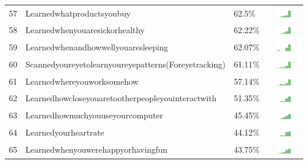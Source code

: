 \documentclass[a4paper,12pt]{article}
\begin{document}
\begin{longtable}{| p{0.5cm} | p{7cm} | p{1cm} | c |}
57 & Learnedwhatproductsyoubuy & 62.5\% & \includegraphics[width = 2cm, height = 0.5cm]{learnedwhatproductsyoubuyWORKCONTACTS} \\  
58 & Learnedwhenyouaresickorhealthy & 62.22\% & \includegraphics[width = 2cm, height = 0.5cm]{learnedwhenyouaresickorhealthyWORKCONTACTS} \\  
59 & Learnedwhenandhowwellyouaresleeping & 62.07\% & \includegraphics[width = 2cm, height = 0.5cm]{learnedwhenandhowwellyouaresleepingWORKCONTACTS} \\  
60 & Scannedyoureyetolearnyoureyepatterns(Foreyetracking) & 61.11\% & \includegraphics[width = 2cm, height = 0.5cm]{scannedyoureyetolearnyoureyepatterns(foreyetracking)WORKCONTACTS} \\  
61 & Learnedwhereyouworksomehow & 57.14\% & \includegraphics[width = 2cm, height = 0.5cm]{learnedwhereyouworksomehowWORKCONTACTS} \\  
62 & Learnedhowcloseyouaretootherpeopleyouinteractwith & 51.35\% & \includegraphics[width = 2cm, height = 0.5cm]{learnedhowcloseyouaretootherpeopleyouinteractwithWORKCONTACTS} \\  
63 & Learnedhowmuchyouuseyourcomputer & 45.45\% & \includegraphics[width = 2cm, height = 0.5cm]{learnedhowmuchyouuseyourcomputerWORKCONTACTS} \\  
64 & Learnedyourheartrate & 44.12\% & \includegraphics[width = 2cm, height = 0.5cm]{learnedyourheartrateWORKCONTACTS} \\  
65 & Learnedwhenyouwerehappyorhavingfun & 43.75\% & \includegraphics[width = 2cm, height = 0.5cm]{learnedwhenyouwerehappyorhavingfunWORKCONTACTS} \\  

\end{longtable}
\end{document}

